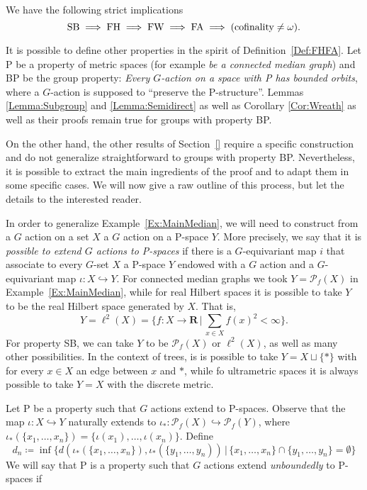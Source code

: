 \begin{lem}
We have the following strict implications \cite{MR1432323,MR0476875 ,MR3299841,2013arXiv1302.5982C}
\[
\textnormal{SB}\implies \textnormal{FH}\implies \textnormal{FW}\implies \textnormal{FA}\implies(\textnormal{cofinality}\neq\omega).
\]

It is possible to define other properties in the spirit of Definition~\ref{Def:FHFA}.
Let P be a property of metric spaces (for example \emph{be a connected median graph}) and BP be the group property: \emph{Every $G$-action on a space with P has bounded orbits}, where a $G$-action is supposed to ``preserve the P-structure''.
Lemmas \ref{Lemma:Subgroup} and \ref{Lemma:Semidirect} as well as Corollary \ref{Cor:Wreath} as well as their proofs remain true for groups with property BP.

On the other hand, the other results of Section~\ref{} require a specific construction and do not generalize straightforward to groups with property BP.
Nevertheless, it is possible to extract the main ingredients of the proof and to adapt them in some specific cases.
We will now give a raw outline of this process, but let the details to the interested reader.

In order to generalize Example~\ref{Ex:MainMedian}, we will need to construct from a $G$ action on a set $X$ a $G$ action on a P-space $Y$.
More precisely, we say that it is \emph{possible to extend $G$ actions to P-spaces} if there is a $G$-equivariant map $i$ that associate to every $G$-set $X$ a P-space $Y$ endowed with a $G$ action and a $G$-equivariant map $\iota\colon X\hookrightarrow Y$.
For connected median graphs we took $Y=\mathcal P_f(X)$ in Example~\ref{Ex:MainMedian}, while for real Hilbert spaces it is possible to take $Y$ to be the real Hilbert space generated by $X$. That is, 
\[Y=\ell^2(X)=\bigg\{f\colon X\to \mathbf R\,\bigg|\, \sum_{x\in X}f(x)^2<\infty\bigg\}.\]
For property SB, we can take $Y$ to be  $\mathcal P_f(X)$ or $\ell^2(X)$, as well as many other possibilities.
In the context of trees, is is possible to take $Y=X\sqcup\{*\}$ with for every $x\in X$ an edge between $x$ and $*$, while fo ultrametric spaces it is always possible to take $Y=X$ with the discrete metric.

Let P be a property such that $G$ actions extend to P-spaces.
Observe that the map $\iota\colon X\hookrightarrow Y$ naturally extends to $\iota_*\colon \mathcal P_f(X)\hookrightarrow \mathcal P_f(Y)$, where $\iota_*(\{x_1,\dots,x_n\})=\{\iota(x_1),\dots,\iota(x_n)\}$.
Define
\[d_n\coloneqq\inf\{d(\iota_*(\{x_1,\dots,x_n\}),\iota_*(\{y_1,\dots,y_n))\,|\,\{x_1,\dots,x_n\}\cap\{y_1,\dots,y_n\}=\emptyset \}\]
We will say that P is a property such that $G$ actions extend \emph{unboundedly} to P-spaces if


\end{lem}
